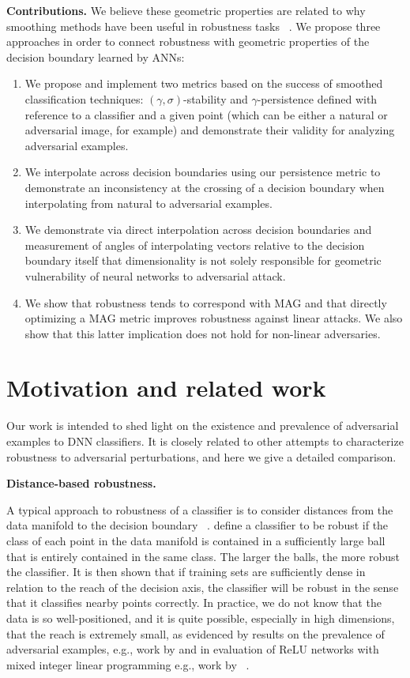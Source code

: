 {\bf Contributions.} We believe these geometric properties are related
to why smoothing methods have been useful in robustness tasks
~\citep{cohen2019certified, lecuyer2019certified, li2019certified}. We propose three approaches in order to connect robustness with geometric properties of the decision boundary learned by ANNs: 
\begin{enumerate}
    \item We propose and implement two metrics based on the success of smoothed classification techniques:  $(\gamma,\sigma)$-stability and $\gamma$-persistence defined with reference to a classifier and a given point (which can be either a natural or adversarial image, for example) and demonstrate their validity for analyzing adversarial examples. 
    \item We interpolate across decision boundaries using our persistence metric to demonstrate an inconsistency at the crossing of a decision boundary when interpolating from natural to adversarial examples.
    \item We demonstrate via direct interpolation across decision boundaries and measurement of angles of interpolating vectors relative to the decision boundary itself that dimensionality is not solely responsible for geometric vulnerability of neural networks to adversarial attack. 
    \item We show that robustness tends to correspond with MAG and
      that directly optimizing a MAG metric improves robustness
      against linear attacks. We also show that this latter
      implication does not hold for non-linear adversaries.  
\end{enumerate}

\section{Motivation and related work}

Our work is intended to shed light on the existence and prevalence of adversarial examples to DNN classifiers. It is closely related to other attempts to characterize robustness to adversarial perturbations, and here we give a detailed comparison.

{\bf Distance-based robustness.}

A typical approach to robustness of a classifier is to consider
distances from the data manifold to the decision boundary
~\citep{Wang2020Improving, xu2023exploring, he2018decision}.
\citet{khoury2018} define a classifier to be robust if the class of
each point in the data manifold is contained in a sufficiently large
ball that is entirely contained in the same class. The larger the
balls, the more robust the classifier. It is then shown that if
training sets are sufficiently dense in relation to the reach of the
decision axis, the classifier will be robust in the sense that it
classifies nearby points correctly. In practice, we do not know that
the data is so well-positioned, and it is quite possible, especially
in high dimensions, that the reach is extremely small, as evidenced by
results on the prevalence of adversarial examples, e.g., work by
\citet{inevitable2018} and in evaluation of ReLU networks with mixed
integer linear programming e.g., work by ~\citet{tjeng2017evaluating}.

